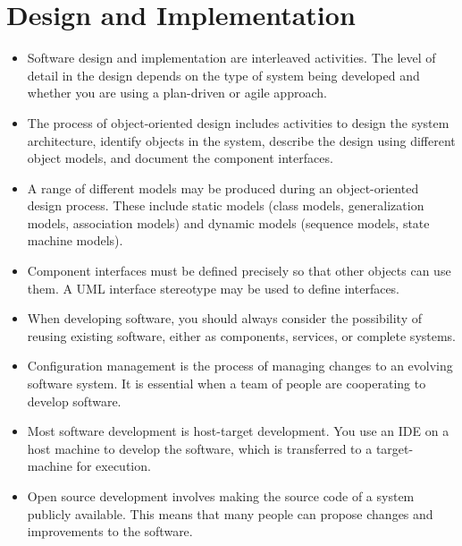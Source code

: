 \documentclass{article}
\begin{document}
\section{Design and Implementation}
\begin{itemize}
    \item Software design and implementation are interleaved activities.  The level of detail in the design depends on the type of system being developed and whether you are using a plan-driven or agile approach.
    \item The process of object-oriented design includes activities to design the system architecture, identify objects in the system, describe the design using different object models, and document the component interfaces.
    \item A range of different models may be produced during an object-oriented design process.
        These include static models (class models, generalization models, association models) and dynamic models (sequence models, state machine models).
    \item Component interfaces must be defined precisely so that other objects can use them.  A UML interface stereotype may be used to define interfaces.
    \item When developing software, you should always consider the possibility of reusing existing software, either as components, services, or complete systems.
    \item Configuration management is the process of managing changes to an evolving software system. 
        It is essential when a team of people are cooperating to develop software.
    \item Most software development is host-target development.  You use an IDE on a host machine to develop the software, which is transferred to a target-machine for execution.
    \item Open source development involves making the source code of a system publicly available.  This means that many people can propose changes and improvements to the software.
\end{itemize}
\end{document}

